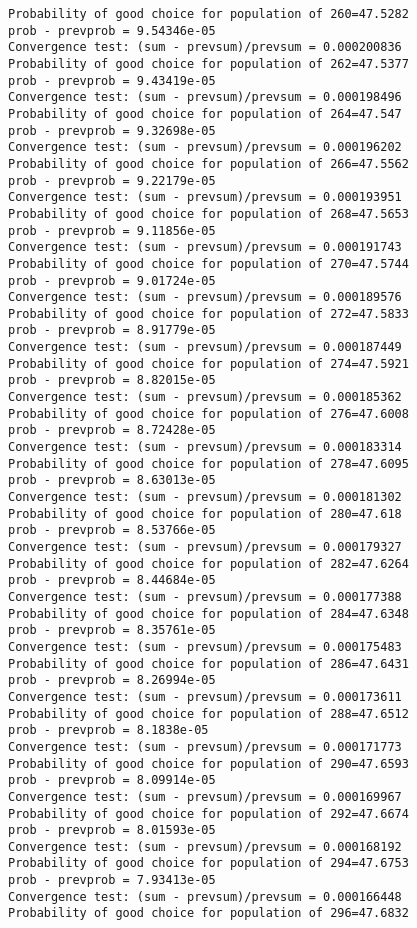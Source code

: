 \documentclass[11pt,onecolumn]{article}
\begin{document}
\begin{verbatim}
Probability of good choice for population of 260=47.5282
prob - prevprob = 9.54346e-05
Convergence test: (sum - prevsum)/prevsum = 0.000200836
Probability of good choice for population of 262=47.5377
prob - prevprob = 9.43419e-05
Convergence test: (sum - prevsum)/prevsum = 0.000198496
Probability of good choice for population of 264=47.547
prob - prevprob = 9.32698e-05
Convergence test: (sum - prevsum)/prevsum = 0.000196202
Probability of good choice for population of 266=47.5562
prob - prevprob = 9.22179e-05
Convergence test: (sum - prevsum)/prevsum = 0.000193951
Probability of good choice for population of 268=47.5653
prob - prevprob = 9.11856e-05
Convergence test: (sum - prevsum)/prevsum = 0.000191743
Probability of good choice for population of 270=47.5744
prob - prevprob = 9.01724e-05
Convergence test: (sum - prevsum)/prevsum = 0.000189576
Probability of good choice for population of 272=47.5833
prob - prevprob = 8.91779e-05
Convergence test: (sum - prevsum)/prevsum = 0.000187449
Probability of good choice for population of 274=47.5921
prob - prevprob = 8.82015e-05
Convergence test: (sum - prevsum)/prevsum = 0.000185362
Probability of good choice for population of 276=47.6008
prob - prevprob = 8.72428e-05
Convergence test: (sum - prevsum)/prevsum = 0.000183314
Probability of good choice for population of 278=47.6095
prob - prevprob = 8.63013e-05
Convergence test: (sum - prevsum)/prevsum = 0.000181302
Probability of good choice for population of 280=47.618
prob - prevprob = 8.53766e-05
Convergence test: (sum - prevsum)/prevsum = 0.000179327
Probability of good choice for population of 282=47.6264
prob - prevprob = 8.44684e-05
Convergence test: (sum - prevsum)/prevsum = 0.000177388
Probability of good choice for population of 284=47.6348
prob - prevprob = 8.35761e-05
Convergence test: (sum - prevsum)/prevsum = 0.000175483
Probability of good choice for population of 286=47.6431
prob - prevprob = 8.26994e-05
Convergence test: (sum - prevsum)/prevsum = 0.000173611
Probability of good choice for population of 288=47.6512
prob - prevprob = 8.1838e-05
Convergence test: (sum - prevsum)/prevsum = 0.000171773
Probability of good choice for population of 290=47.6593
prob - prevprob = 8.09914e-05
Convergence test: (sum - prevsum)/prevsum = 0.000169967
Probability of good choice for population of 292=47.6674
prob - prevprob = 8.01593e-05
Convergence test: (sum - prevsum)/prevsum = 0.000168192
Probability of good choice for population of 294=47.6753
prob - prevprob = 7.93413e-05
Convergence test: (sum - prevsum)/prevsum = 0.000166448
Probability of good choice for population of 296=47.6832

\end{verbatim}
\end{document}
